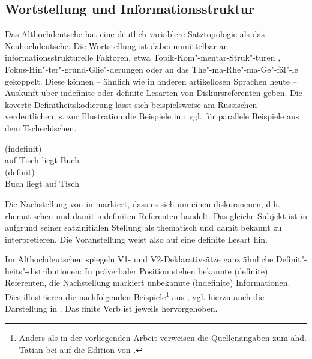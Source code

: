 \subsection{Wortstellung und Informationsstruktur} \label{is-ahd.}

Das Althochdeutsche hat eine deutlich variablere Satztopologie als das Neuhochdeutsche. Die Wortstellung ist dabei unmittelbar an informationsstrukturelle Faktoren, etwa  Topik-Kom"-mentar-Struk"-turen
\parencite{Hinterholzl2005,Ramers2005,Solf2008}, Fokus-Hin"-ter"-grund-Glie"-derungen \parencite{Petrova2009} oder an das The"-ma-Rhe"-ma-Ge"-fäl"-le \parencite{Leiss2000} gekoppelt. Diese können -- ähnlich wie in anderen artikellosen Sprachen heute -- Auskunft über indefinite oder definite Lesarten von Diskursreferenten geben. Die koverte Definitheitskodierung lässt sich beispielsweise am Russischen verdeutlichen, s. zur Illustration die Beispiele in  \parencite[s.][191]{Szczepaniak2015};  vgl.  \textcite[5]{Leiss2000} für parallele Beispiele aus dem Tschechischen. 

\begin{exe}
	\ex \label{ex:is}   
	\begin{xlist}
		\ex \label{ex:is-indef} 
		\gll {}    (indefinit) \\
		auf Tisch liegt Buch\\
		\trans {}
		\ex \label{ex:is-def} 
		\gll {}    (definit) \\
		Buch liegt auf Tisch\\
		\trans {}
	\end{xlist}
\end{exe}

\noindent
Die Nachstellung von  in  markiert, dass es sich um einen diskursneuen, d.h. rhematischen und damit indefiniten Referenten handelt. Das gleiche Subjekt ist in  aufgrund seiner  satzinitialen Stellung als thematisch und damit bekannt zu interpretieren. Die Voranstellung weist also auf eine definite Lesart hin.

Im Althochdeutschen spiegeln V1- und V2-Deklarativsätze ganz ähnliche Definit"-heits"-distributionen: In präverbaler Position stehen bekannte (definite) Referenten, die Nachstellung markiert unbekannte (indefinite) Informationen. Dies illustrieren die nachfolgenden Beispiele\footnote{Anders als in der vorliegenden Arbeit verweisen die Quellenangaben zum ahd. Tatian bei \textcite{Hinterholzl2010} auf die Edition von \textcite{Masser1994}.} aus \textcite[316]{Hinterholzl2010}, vgl. hierzu auch die Darstellung in \textcite[46f.]{Ferraresi2014}. Das finite Verb ist jeweils hervorgehoben.

